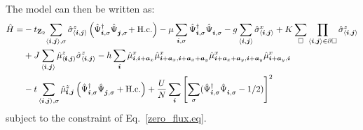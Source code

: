 The model  can then be written as:
\begin{align}
	\hat{H} =& - t_{\Ztwo}\! \sum_{\langle \vec{i}, \vec{j} \rangle, \sigma } \hat{\sigma}^z_{\langle \vec{i}, \vec{j} \rangle}
	\left(\hat{\Psi}^{\dagger}_{\vec{i},\sigma} \hat{\Psi}^{\phantom{\dagger}}_{\vec{j},\sigma} \!+ \hc \right) - \mu \sum_{\vec{i},\sigma} \hat{\Psi}^{\dagger}_{\vec{i},\sigma} \hat{\Psi}^{\phantom{\dagger}}_{\vec{i},\sigma}  
	-g \sum_{\langle \vec{i}, \vec{j} \rangle } \hat{\sigma}^{x}_{\langle \vec{i}, \vec{j} \rangle }  +
	  K \sum_{\square} \prod_{\langle \vec{i}, \vec{j} \rangle \in \partial \square} \hat{\sigma}^{z}_{\langle \vec{i}, \vec{j} \rangle}  \nonumber \\
	& + J  \sum_{\langle \vec{i}, \vec{j} \rangle}  \hat{\mu}^z_{ \langle \pmb{i}, \ve{j} \rangle }  \hat{\sigma}^{z}_{\langle \vec{i}, \vec{j} \rangle}    
	      -  h \sum_{ \vec{i} } \hat{\mu}^{x}_{\ve{i},\ve{i} + \ve{a}_x } \hat{\mu}^{x}_{\ve{i} + \ve{a}_x, \ve{i} + \ve{a}_x + \ve{a}_y }   \hat{\mu}^{x}_{\ve{i} + \ve{a}_x + \ve{a}_y, \ve{i} + \ve{a}_y  }
	         \hat{\mu}^{x}_{\ve{i} + \ve{a}_y, \ve{i}  }	\nonumber  \\      
	&        - t  \sum_{\langle \vec{i}, \vec{j} \rangle, \sigma }   \hat{\mu}^z_{\pmb{i},\ve{j}}    \left( \hat{\Psi}^{\dagger}_{\vec{i},\sigma} \hat{\Psi}^{\phantom{\dagger}}_{\vec{j},\sigma} 	+ \hc \right) + \frac{U}{N}\sum_{\ve{i}} \left[ \sum_{\sigma}  ( \hat{\Psi}^{\dagger}_{\ve{i},\sigma}  \hat{\Psi}^{\phantom\dagger}_{\ve{i},\sigma} - 1/2 ) \right]^2 
\end{align}  
subject to the constraint of Eq.~\eqref{zero_flux.eq}.  

